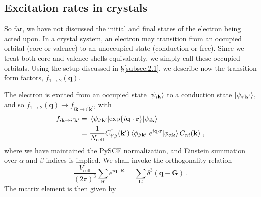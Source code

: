 \documentclass[
    prd, twocolumn, superscriptaddress, nofootinbib, amsmath, amssymb,
    aps, floatfix,preprintnumbers
]{revtex4-2}
\begin{document}
    \subsection{Excitation rates in crystals}
        So far, we have not discussed the initial and final states of the electron being acted upon. In a crystal system, an electron may transition from an occupied orbital (core or valence) to an unoccupied state (conduction or free). Since we treat both core and valence shells equivalently, we simply call these occupied orbitals. Using the setup discussed in \S\ref{subsec:2.1}, we describe now the transition form factors, $f_{1\rightarrow2}(\mathbf{q})$.
        
        The electron is excited from an occupied state $\ket{\psi_{i\mathbf{k}}}$ to a conduction state $\ket{\psi_{i^\prime\mathbf{k}^\prime}}$, and so $f_{1\rightarrow2}(\mathbf{q}) \longrightarrow f_{i\mathbf{k}\rightarrow i^\prime\mathbf{k}^\prime}$, with 
        \begin{equation}
            \begin{split}
                f_{i\mathbf{k}\rightarrow i^\prime\mathbf{k}^\prime} =&\ \mel{\psi_{i^\prime\mathbf{k}^\prime}}{\exp{i\mathbf{q\cdot r}}}{\psi_{i\mathbf{k}}}\\
                =&\ \frac{1}{N_\mathrm{cell}} C_{i^\prime \beta}^\dagger(\mathbf{k^\prime})\mel{\phi_{\beta \mathbf{k}^\prime}}{e^{i\mathbf{q\cdot r}}}{\phi_{\alpha \mathbf{k}}}C_{\alpha i}(\mathbf{k})\ ,
            \end{split}
        \end{equation}
        where we have maintained the PySCF normalization, and Einstein summation over $\alpha$ and $\beta$ indices is implied. We shall invoke the orthogonality relation
        \begin{equation}
            \frac{V_\mathrm{cell}}{(2\pi)^3}\sum_\mathbf{R}e^{i\mathbf{q\cdot R}} = \sum_\mathbf{G}\delta^3\left(\mathbf{q - G}\right)\ .
        \end{equation}
        The matrix element is then given by 
\end{document}
